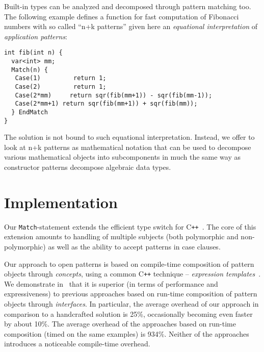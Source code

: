 \documentclass[10pt]{sigplanconf}
\makeatletter
\newcommand{\term}[1]{\emph{#1}}
\DeclareRobustCommand{\Cpp}{C\texttt{++}}
\DeclareRobustCommand{\code}[1]{{\lstinline[breaklines=false,escapechar=@]{#1}}}
\makeatother
\begin{document}
Built-in types can be analyzed and decomposed through pattern matching too. The 
following example defines a function for fast computation of Fibonacci numbers 
with so called ``n+k patterns'' given here an \term{equational interpretation} of 
\term{application patterns}:

\begin{lstlisting}[keepspaces]
int fib(int n) {
  var<int> mm;
  Match(n) {
   Case(1)         return 1;     
   Case(2)         return 1;
   Case(2*mm)     return sqr(fib(mm+1)) - sqr(fib(mm-1));
   Case(2*mm+1) return sqr(fib(mm+1)) + sqr(fib(mm));
  } EndMatch
}
\end{lstlisting}

\noindent
The solution is not bound to such equational interpretation. Instead, we offer 
to look at n+k patterns as mathematical notation that can be used to decompose 
various mathematical objects into subcomponents in much the same way as 
constructor patterns decompose algebraic data types.

\section{Implementation} %
\label{sec:impl}

Our \code{Match}-statement extends the efficient type switch for 
\Cpp{}~\cite{TS12}. The core of this extension amounts to handling of
multiple subjects (both polymorphic and non-polymorphic) as well as the ability 
to accept patterns in case clauses. %

Our approach to open patterns is based on compile-time composition of 
pattern objects through \term{concepts}, using a common \Cpp{} technique -- \term{expression 
templates}~\cite{Veldhuizen95expressiontemplates}. We demonstrate in~\cite{SolodkyyThesis}
that it is superior (in terms of performance and expressiveness) to previous 
approaches based on run-time composition of pattern objects through \term{interfaces}. 
In particular, the average overhead of our approach in comparison to a 
handcrafted solution is 25\%, occasionally becoming even faster by about 10\%. 
The average overhead of the approaches based on run-time composition (timed on 
the same examples) is 934\%. Neither of the approaches introduces a noticeable 
compile-time overhead.
\end{document}
